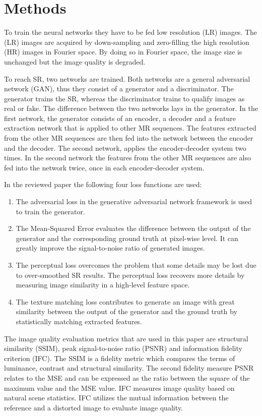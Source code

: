 \documentclass[conference]{IEEEtran}
\begin{document}
\section{Methods}
To train the neural networks they have to be fed low resolution (LR) images. The
(LR) images are acquired by down-sampling and zero-filling the high resolution
(HR) images in Fourier space. By doing so in Fourier space, the image size is
unchanged but the image quality is degraded.

To reach SR, two networks are trained. Both networks are a general adversarial
network (GAN), thus they consist of a generator and a discriminator. The
generator trains the SR, whereas the discriminator trains to qualify images as
real or fake. The difference between the two networks lays in the generator. In
the first network, the generator consists of an encoder, a decoder and a feature
extraction network that is applied to other MR sequences. The features extracted
from the other MR sequences are then fed into the network between the encoder
and the decoder. The second network, applies the encoder-decoder system two
times. In the second network the features from the other MR sequences are also
fed into the network twice, once in each encoder-decoder system.

In the reviewed paper the following four loss functions are used:

\begin{enumerate}
    \item The adversarial loss in the generative adversarial network framework is used to train the generator.
    \item The Mean-Squared Error evaluates the difference between the output of
      the generator and the corresponding ground truth at pixel-wise level. It
      can greatly improve the signal-to-noise ratio of generated images.
    \item The perceptual loss overcomes the problem that some details may be
      lost due to over-smoothed SR results. The perceptual loss recovers more
      details by measuring image similarity in a high-level feature space.
    \item The texture matching loss contributes to generate an image with great
      similarity between the output of the generator and the ground truth by
      statistically matching extracted features.
\end{enumerate}

The image quality evaluation metrics that are used in this paper are structural
similarity (SSIM), peak signal-to-noise ratio (PSNR) and information fidelity
criterion (IFC). The SSIM is a fidelity metric which compares the terms of
luminance, contrast and structural similarity. The second fidelity measure PSNR
relates to the MSE and can be expressed as the ratio between the square of the
maximum value and the MSE value. IFC measures image quality based on natural
scene statistics. IFC utilizes the mutual information between the reference and
a distorted image to evaluate image quality.
\end{document}
